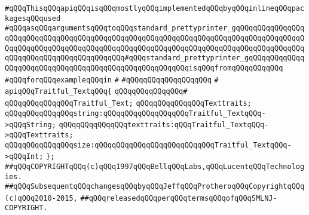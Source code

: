 \verb|#qQQqThisqQQqapiqQQqisqQQqmostlyqQQqimplementedqQQqbyqQQqinlineqQQqpackagesqQQqused|\newline
\verb|#qQQqasqQQqargumentsqQQqtoqQQqstandard_prettyprinter_gqQQqqQQqqQQqqQQqqQQqqQQqqQQqqQQqqQQqqQQqqQQqqQQqqQQqqQQqqQQqqQQqqQQqqQQqqQQqqQQqqQQqqQQqqQQqqQQqqQQqqQQqqQQqqQQqqQQqqQQqqQQqqQQqqQQqqQQqqQQqqQQqqQQqqQQqqQQqqQQqqQQqqQQqqQQqqQQqqQQqqQQq#qQQqstandard_prettyprinter_gqQQqqQQqqQQqqQQqqQQqqQQqqQQqqQQqqQQqqQQqqQQqqQQqqQQqqQQqisqQQqfromqQQqqQQqqQQq|\newline
\verb|#qQQqforqQQqexampleqQQqin|\newline
\verb|#|\newline
\verb|#qQQqqQQqqQQqqQQqqQQq|\newline
\verb|#|\newline
\verb|apiqQQqTraitful_TextqQQq{|\newline
\verb|qQQqqQQqqQQqqQQq#|\newline
\verb|qQQqqQQqqQQqqQQqTraitful_Text;|\newline
\verb|qQQqqQQqqQQqqQQqTexttraits;|\newline
\newline
\verb|qQQqqQQqqQQqqQQqstring:qQQqqQQqqQQqqQQqqQQqTraitful_TextqQQq->qQQqString;|\newline
\verb|qQQqqQQqqQQqqQQqtexttraits:qQQqTraitful_TextqQQq->qQQqTexttraits;|\newline
\verb|qQQqqQQqqQQqqQQqsize:qQQqqQQqqQQqqQQqqQQqqQQqqQQqTraitful_TextqQQq->qQQqInt;|\newline
\verb|};|\newline
\newline
\newline
\newline
\verb|##qQQqCOPYRIGHTqQQq(c)qQQq1997qQQqBellqQQqLabs,qQQqLucentqQQqTechnologies.|\newline
\verb|##qQQqSubsequentqQQqchangesqQQqbyqQQqJeffqQQqProtheroqQQqCopyrightqQQq(c)qQQq2010-2015,|\newline
\verb|##qQQqreleasedqQQqperqQQqtermsqQQqofqQQqSMLNJ-COPYRIGHT.|\newline

